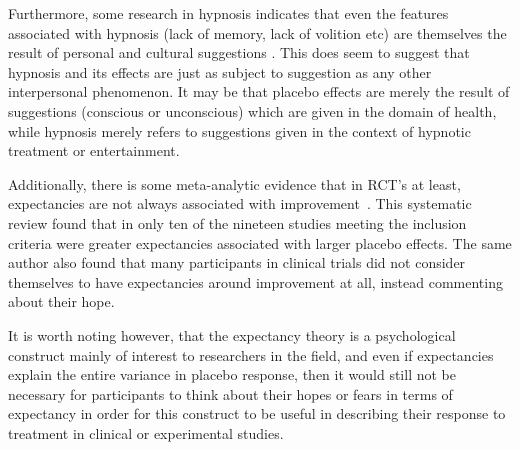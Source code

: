 
Furthermore, some research in hypnosis indicates that even the features associated with hypnosis (lack of memory, lack of volition etc) are themselves the result of personal and cultural suggestions \cite{Kirsch1999}. This does seem to suggest that hypnosis and its effects are just as subject to suggestion as any other interpersonal phenomenon.  It may be that placebo effects are merely the result of suggestions (conscious or unconscious) which are given in the domain of health, while hypnosis merely refers to suggestions given in the context of hypnotic treatment or entertainment. 

Additionally, there is some meta-analytic evidence that in RCT's at least, expectancies are not always associated with improvement~\cite{DiBlasi2001}. This systematic review found that in only ten of the nineteen studies meeting the inclusion criteria were greater expectancies associated with larger placebo effects. The same author also found that many participants in clinical trials did not consider themselves to have expectancies around improvement at all, instead commenting about their hope. 

It is worth noting however, that the expectancy theory is a psychological construct mainly of interest to researchers in the field, and even if expectancies explain the entire variance in placebo response, then it would still not be necessary for participants to think about their hopes or fears in terms of expectancy in order for this construct to be  useful  in describing their response to treatment in clinical or experimental studies. 


